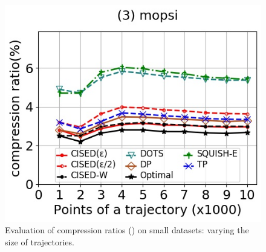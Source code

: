 \begin{figure}[tb!]
	\includegraphics[scale=0.348]{Figures/Exp-SED-CR-size-mopsi.jpg}		
	\vspace{-2ex}
	\caption{\small Evaluation of compression ratios (\sed) on small datasets: varying the size of
		trajectories.}
	\label{fig:cr-sed-size}
	\vspace{-2ex}
\end{figure}
